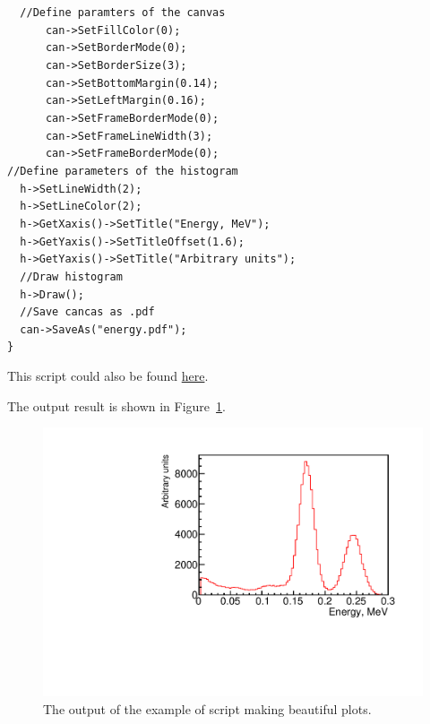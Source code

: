 \documentclass[12pt]{article}
\begin{document}
\verb|	//Define paramters of the canvas|\\
\verb|	    can->SetFillColor(0);|\\
\verb|	    can->SetBorderMode(0);|\\
\verb|	    can->SetBorderSize(3);|\\
\verb|	    can->SetBottomMargin(0.14);|\\
\verb|	    can->SetLeftMargin(0.16);|\\
\verb|	    can->SetFrameBorderMode(0);|\\
\verb|	    can->SetFrameLineWidth(3);|\\
\verb|	    can->SetFrameBorderMode(0);|\\

\verb|//Define parameters of the histogram|\\
\verb|  h->SetLineWidth(2);|\\
\verb|  h->SetLineColor(2);|\\
\verb|  h->GetXaxis()->SetTitle("Energy, MeV");|\\
\verb|  h->GetYaxis()->SetTitleOffset(1.6);|\\ 
\verb|  h->GetYaxis()->SetTitle("Arbitrary units"); |\\  
\verb|	//Draw histogram|\\
\verb|  h->Draw();|\\
\verb|  //Save cancas as .pdf|\\
\verb|  can->SaveAs("energy.pdf");|\\
\verb|}|

This script could also be found
\href{https://github.com/kochebina/ROOT_manual_for_Gate_users/tree/master/Materials}{here}.  

The output result is shown in Figure~\ref{fig:energy}.

\begin{figure}[h]
\centering
\includegraphics[scale=0.6]{figs/energy.pdf}
\caption{The output of the example of script making beautiful plots.}
\label{fig:energy}
\end{figure}
\end{document}
